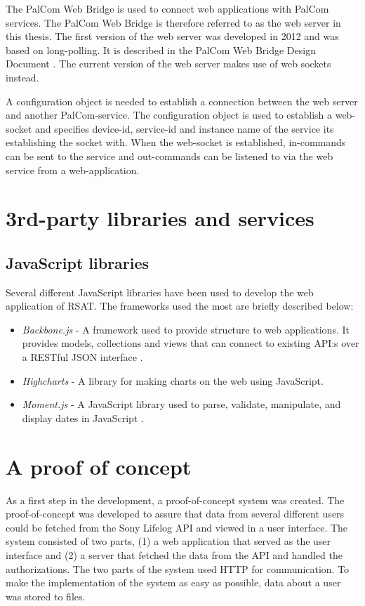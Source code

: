 \documentclass{cslthse-msc}
\begin{document}
The PalCom Web Bridge is used to connect web applications with PalCom services.  The PalCom Web Bridge is therefore referred to as the web server in this thesis. The first version of the web server was developed in 2012 and was based on long-polling. It is described in the PalCom Web Bridge Design Document \cite{sandholm2012palcom}. The current version of the web server makes use of web sockets instead. 

A configuration object is needed to establish a connection between the web server and another PalCom-service. The configuration object is used to establish a web-socket and specifies device-id, service-id and instance name of the service its establishing the socket with. When the web-socket is established, in-commands can be sent to the service and out-commands can be listened to via the web service from a web-application.

\section{3rd-party libraries and services}

\subsection{JavaScript libraries}
Several different JavaScript libraries have been used to develop the web application of RSAT. The frameworks used the most are briefly described below: 

\begin{itemize}
    \item \emph{Backbone.js} - A framework used to provide structure to web applications. It provides models, collections and views that can connect to existing API:s over a RESTful JSON interface \cite{osmani2013developing}. 
    \item \emph{Highcharts} - A library for making charts on the web using JavaScript\cite{kuan2012learning}.
    \item \emph{Moment.js} - A JavaScript library used to parse, validate, manipulate, and display dates in JavaScript \cite{moment}.
\end{itemize}

\section{A proof of concept}

As a first step in the development, a proof-of-concept system was created. The proof-of-concept was developed to assure that data from several different users could be fetched from the Sony Lifelog API and viewed in a user interface. The system consisted of two parts, (1) a web application that served as the user interface and (2) a server that fetched the data from the API and handled the authorizations. The two parts of the system used HTTP for communication. To make the implementation of  the system as easy as possible, data about a user was stored to files. 
\end{document}
